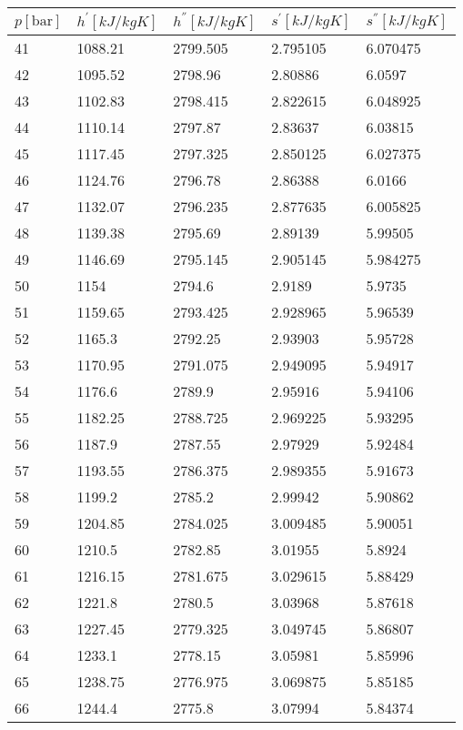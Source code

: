 \documentclass[twocolumn]{article}
\begin{document}
\begin{tabular}{l|l|l|l|l}
	$p [\text{bar}] $ & $h^{'} [kJ/kg K]$ & $h^{''} [kJ/kg K]$ & $s^{'} [kJ/kg K] $ & $s^{''} [kJ/kg K]$ \\ \hline
41	&	1088.21	&	2799.505	&	2.795105	&	6.070475 \\ \hline
42	&	1095.52	&	2798.96	&	2.80886	&	6.0597 \\ \hline
43	&	1102.83	&	2798.415	&	2.822615	&	6.048925 \\ \hline
44	&	1110.14	&	2797.87	&	2.83637	&	6.03815 \\ \hline
45	&	1117.45	&	2797.325	&	2.850125	&	6.027375 \\ \hline
46	&	1124.76	&	2796.78	&	2.86388	&	6.0166 \\ \hline
47	&	1132.07	&	2796.235	&	2.877635	&	6.005825 \\ \hline
48	&	1139.38	&	2795.69	&	2.89139	&	5.99505 \\ \hline
49	&	1146.69	&	2795.145	&	2.905145	&	5.984275 \\ \hline
50	&	1154	&	2794.6	&	2.9189	&	5.9735 \\ \hline
51	&	1159.65	&	2793.425	&	2.928965	&	5.96539 \\ \hline
52	&	1165.3	&	2792.25	&	2.93903	&	5.95728 \\ \hline
53	&	1170.95	&	2791.075	&	2.949095	&	5.94917 \\ \hline
54	&	1176.6	&	2789.9	&	2.95916	&	5.94106 \\ \hline
55	&	1182.25	&	2788.725	&	2.969225	&	5.93295 \\ \hline
56	&	1187.9	&	2787.55	&	2.97929	&	5.92484 \\ \hline
57	&	1193.55	&	2786.375	&	2.989355	&	5.91673 \\ \hline
58	&	1199.2	&	2785.2	&	2.99942	&	5.90862 \\ \hline
59	&	1204.85	&	2784.025	&	3.009485	&	5.90051 \\ \hline
60	&	1210.5	&	2782.85	&	3.01955	&	5.8924 \\ \hline
61	&	1216.15	&	2781.675	&	3.029615	&	5.88429 \\ \hline
62	&	1221.8	&	2780.5	&	3.03968	&	5.87618 \\ \hline
63	&	1227.45	&	2779.325	&	3.049745	&	5.86807 \\ \hline
64	&	1233.1	&	2778.15	&	3.05981	&	5.85996 \\ \hline
65	&	1238.75	&	2776.975	&	3.069875	&	5.85185 \\ \hline
66	&	1244.4	&	2775.8	&	3.07994	&	5.84374 \\ \hline

\end{tabular}
\end{document}
